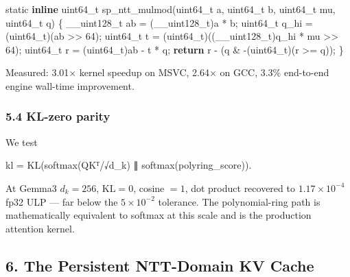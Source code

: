 \documentclass[
  11pt,
]{article}
\newenvironment{Shaded}{}{}
\newcommand{\ControlFlowTok}[1]{\textcolor[rgb]{0.00,0.44,0.13}{\textbf{#1}}}
\newcommand{\DataTypeTok}[1]{\textcolor[rgb]{0.56,0.13,0.00}{#1}}
\newcommand{\DecValTok}[1]{\textcolor[rgb]{0.25,0.63,0.44}{#1}}
\newcommand{\KeywordTok}[1]{\textcolor[rgb]{0.00,0.44,0.13}{\textbf{#1}}}
\newcommand{\NormalTok}[1]{#1}
\begin{document}
\begin{Shaded}
\begin{Highlighting}[]
\DataTypeTok{static} \KeywordTok{inline} \DataTypeTok{uint64\_t}\NormalTok{ sp\_ntt\_mulmod(}\DataTypeTok{uint64\_t}\NormalTok{ a, }\DataTypeTok{uint64\_t}\NormalTok{ b,}
                                     \DataTypeTok{uint64\_t}\NormalTok{ mu, }\DataTypeTok{uint64\_t}\NormalTok{ q) \{}
\NormalTok{    \_\_uint128\_t ab = (\_\_uint128\_t)a * b;}
    \DataTypeTok{uint64\_t}\NormalTok{ q\_hi = (}\DataTypeTok{uint64\_t}\NormalTok{)(ab \textgreater{}\textgreater{} }\DecValTok{64}\NormalTok{);}
    \DataTypeTok{uint64\_t}\NormalTok{ t    = (}\DataTypeTok{uint64\_t}\NormalTok{)((\_\_uint128\_t)q\_hi * mu \textgreater{}\textgreater{} }\DecValTok{64}\NormalTok{);}
    \DataTypeTok{uint64\_t}\NormalTok{ r    = (}\DataTypeTok{uint64\_t}\NormalTok{)ab {-} t * q;}
    \ControlFlowTok{return}\NormalTok{ r {-} (q \& {-}(}\DataTypeTok{uint64\_t}\NormalTok{)(r \textgreater{}= q));}
\NormalTok{\}}
\end{Highlighting}
\end{Shaded}

Measured: 3.01× kernel speedup on MSVC, 2.64× on GCC, 3.3\% end-to-end
engine wall-time improvement.

\hypertarget{kl-zero-parity}{%
\subsubsection{5.4 KL-zero parity}\label{kl-zero-parity}}

We test

\begin{Shaded}
\begin{Highlighting}[]
\NormalTok{kl = KL(softmax(QKᵀ/√d\_k) ∥ softmax(polyring\_score)).}
\end{Highlighting}
\end{Shaded}

At Gemma3 \(d_k = 256\), \(\mathrm{KL} = 0\), cosine \(= 1\), dot
product recovered to \(1.17\times10^{-4}\) fp32 ULP --- far below the
\(5 \times 10^{-2}\) tolerance. The polynomial-ring path is
mathematically equivalent to softmax at this scale and is the production
attention kernel.

\hypertarget{the-persistent-ntt-domain-kv-cache}{%
\subsection{6. The Persistent NTT-Domain KV
Cache}\label{the-persistent-ntt-domain-kv-cache}}
\end{document}
